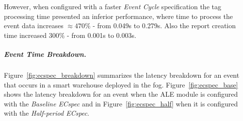     

    However, when configured with a faster \textit{Event Cycle} specification the tag processing time
    presented an inferior performance, where time to process the event data increases $\approx470\%$
    - from 0.049s to 0.279s. Also the report creation time increased $300\%$ - from 0.001s to 0.003s.

    \subparagraph{Event Time Breakdown.}
    \label{subp:fog_event_breakdown}
    Figure~\ref{fig:ecspec_breakdown} summarizes the latency breakdown for an event that occurs in a
    smart warehouse deployed in the fog. Figure~\ref{fig:ecspec_base} shows the latency breakdown for an event when the
    \gls{ALE} module is configured with the \textit{Baseline ECspec} and in Figure~\ref{fig:ecspec_half}
    when it is configured with the \textit{Half-period ECspec}.\\

